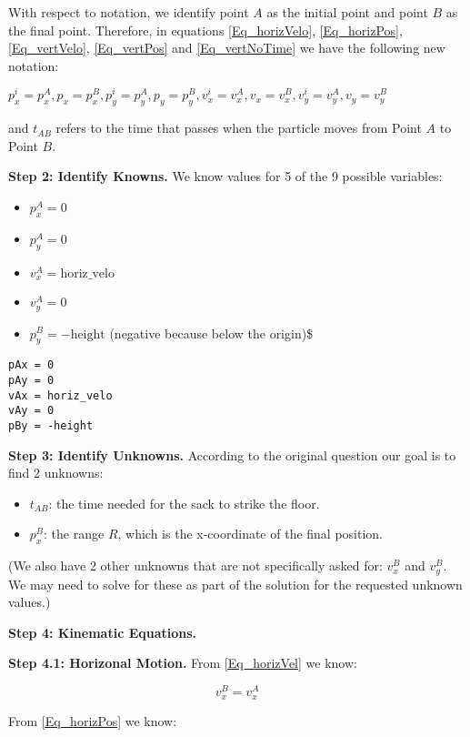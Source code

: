 \documentclass[11pt]{article}
\begin{document}
With respect to notation, we identify point $A$ as the initial point
and point $B$ as the final point.  Therefore, in equations
\ref{Eq_horizVelo},
\ref{Eq_horizPos},
\ref{Eq_vertVelo}, \ref{Eq_vertPos}
and \ref{Eq_vertNoTime} we have the following new
notation:

$p^i_x = p^A_x, p_x = p^B_x, p^i_y = p^A_y, p_y = p^B_y, v^i_x = v^A_x, v_x = v^B_x, v^i_y = v^A_y, v_y = v^B_y$

and $t_{AB}$ refers to the time that passes when the particle moves from Point $A$ to Point $B$.

\textbf{Step 2: Identify Knowns.} We know values for 5 of the 9 possible
variables:

\begin{itemize}
\item $p_x^A = 0$
\item $p_y^A = 0$
\item $v_x^A = \text{horiz_velo}$
\item $v_y^A = 0$
\item $p_y^B = -\text{height}$ (negative because below the origin)\$
\end{itemize}

\begin{verbatim}
pAx = 0
pAy = 0
vAx = horiz_velo
vAy = 0
pBy = -height
\end{verbatim}

\textbf{Step 3: Identify Unknowns.} According to the original question our goal is to find 2 unknowns:

\begin{itemize}
\item $t_{AB}$: the time needed for the sack to strike the floor.
\item $p_x^B$: the range $R$, which is the x-coordinate of the final position.
\end{itemize}

(We also have 2 other unknowns that are not specifically asked for:
$v_x^B$ and $v_y^B$.  We may need to solve for these as part of the
solution for the requested unknown values.)

\textbf{Step 4: Kinematic Equations.}

\textbf{Step 4.1: Horizonal Motion.} From \ref{Eq_horizVel} we know:

\begin{equation}
\label{Eq_1}
v_x^B = v_x^A
\end{equation}

From \ref{Eq_horizPos} we know:
\end{document}
